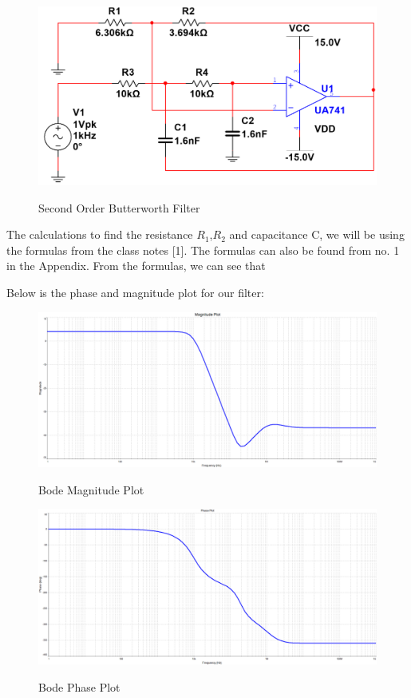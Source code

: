 \documentclass[12pt]{article}
\begin{document}
\begin{figure}[H]
    \centering
    \includegraphics[height=0.2\textwidth]{Images/partAcircuit.png}\\
    \caption{Second Order Butterworth Filter}
    \label{fig:SecondOrderButterworthFilter}
\end{figure}

The calculations to find the resistance $R_1$,$R_2$ and capacitance C, we will be using the formulas from the class notes [1].  
The formulas can also be found from no. 1 in the Appendix. From the formulas, we can see that

\begin{center}
\end{center}
Below is the phase and magnitude plot for our filter:

\begin{figure}[H]
    \centering
    \includegraphics[height=0.4\textwidth]{Images/magnitude_plot.png}\\
    \caption{Bode Magnitude Plot}
    \label{fig:magntitudeplot}
\end{figure}


\begin{figure}[H]
    \centering
    \includegraphics[height=0.4\textwidth]{Images/phase_plot.png}\\
    \caption{Bode Phase Plot}
    \label{fig:phaseplot}
\end{figure}
\end{document}
